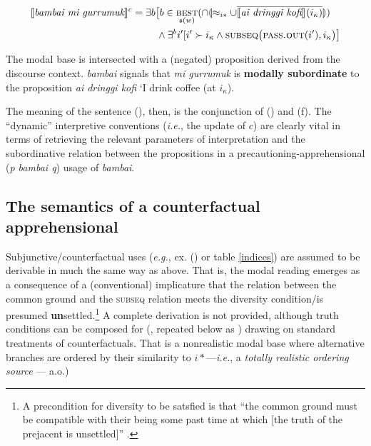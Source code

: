 $$\begin{multlined} \denote[c]{\textit{bambai mi gurrumuk}} = \exists b\big[b\in\underset{\mathfrak s(w)}{\textsc{best}}(\cap\llparenthesis\approx_{i*}\cup\overline{\denote{\textit{ai dringgi kofi}}(i_\kappa)}\rrparenthesis)\\\wedge \exists^bi'[i'\succ i_\kappa\wedge \textsc{subseq}\big(\textsc{pass.out}(i'),i_\kappa\big)\big]\end{multlined}$$


The modal base is intersected with a (negated) proposition derived from the discourse context. \textit{bambai} signals that \textit{mi gurrumuk} is \textbf{modally subordinate} to the proposition \textit{ai dringgi kofi} `I drink coffee (at $ i_\kappa $).
\xe

\noindent The meaning of the sentence (), then, is the conjunction of () and (f). The ``dynamic'' interpretive conventions (\textit{i.e.}, the update of $ c $) are clearly vital in terms of retrieving the relevant parameters of interpretation and the subordinative relation between the propositions in a precautioning-apprehensional (\textit{p bambai q}) usage of \textit{bambai}.

\subsection{The semantics of a counterfactual apprehensional}

Subjunctive/counterfactual uses (\textit{e.g.}, ex. () or table \ref{indices}) are assumed to be derivable in much the same way as above. That is, the modal reading emerges as a consequence of a (conventional) implicature that the relation between the common ground and the \textsc{subseq} relation meets the diversity condition/is presumed \textbf{un}settled.\footnote{A precondition for diversity to be satsfied is that ``the common ground must be compatible with their being some past time at which [the truth of the prejacent is unsettled]'' \citep[85]{Condoravdi2002}.} A complete derivation is not provided, although truth conditions can be composed for (, repeated below as ) drawing on standard treatments of counterfactuals. That is a nonrealistic modal base where alternative branches are ordered by their similarity to $ i* $---\textit{i.e.}, a \textit{totally realistic ordering source} --- \citealp[\textit{cf.}][]{Kratzer1981a,Kratzer2012,Lewis1973,Lewis1981} a.o.)

